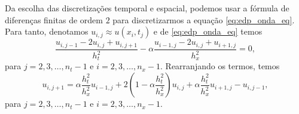 Da escolha das discretizações temporal e espacial, podemos usar a fórmula de diferenças finitas de ordem $2$ para discretizarmos a equação \eqref{eq:edp_onda_eq}. Para tanto, denotamos $u_{i,j} \approx u(x_i,t_j)$ e de \eqref{eq:edp_onda_eq} temos
\begin{equation}
  \frac{u_{i,j-1}-2u_{i,j}+u_{i,j+1}}{h_t^2} - \alpha\frac{u_{i-1,j}-2u_{i,j}+u_{i+1,j}}{h_x^2} = 0,
\end{equation}
para $j=2, 3, \dotsc, n_t-1$ e $i=2, 3, \dotsc, n_x-1$. Rearranjando os termos, temos
\begin{equation}\label{eq:edp_onda_aux1}
  u_{i,j+1} = \alpha\frac{h_t^2}{h_x^2}u_{i-1,j} + 2\left(1-\alpha\frac{h_t^2}{h_x^2}\right)u_{i,j} + \alpha\frac{h_t^2}{h_x^2}u_{i+1,j} - u_{i,j-1},
\end{equation}
para $j=2, 3, \dotsc, n_t-1$ e $i=2, 3, \dotsc, n_x-1$.

